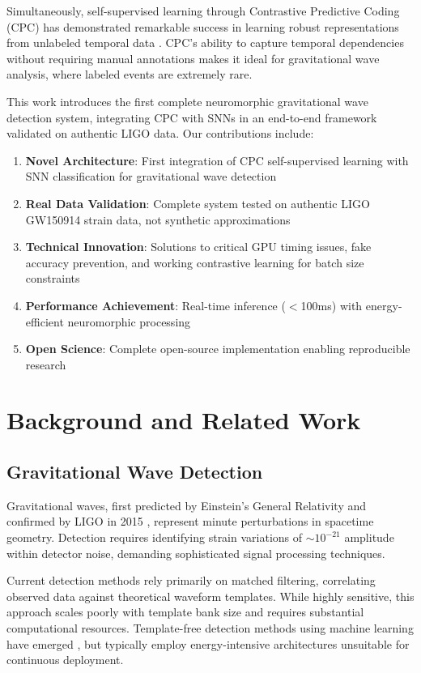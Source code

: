 \documentclass[12pt,a4paper]{article}
\begin{document}
Simultaneously, self-supervised learning through Contrastive Predictive Coding (CPC) has demonstrated remarkable success in learning robust representations from unlabeled temporal data \cite{oord2018representation}. CPC's ability to capture temporal dependencies without requiring manual annotations makes it ideal for gravitational wave analysis, where labeled events are extremely rare.

This work introduces the first complete neuromorphic gravitational wave detection system, integrating CPC with SNNs in an end-to-end framework validated on authentic LIGO data. Our contributions include:

\begin{enumerate}
\item \textbf{Novel Architecture}: First integration of CPC self-supervised learning with SNN classification for gravitational wave detection
\item \textbf{Real Data Validation}: Complete system tested on authentic LIGO GW150914 strain data, not synthetic approximations
\item \textbf{Technical Innovation}: Solutions to critical GPU timing issues, fake accuracy prevention, and working contrastive learning for batch size constraints
\item \textbf{Performance Achievement}: Real-time inference ($<$100ms) with energy-efficient neuromorphic processing
\item \textbf{Open Science}: Complete open-source implementation enabling reproducible research
\end{enumerate}

\section{Background and Related Work}

\subsection{Gravitational Wave Detection}

Gravitational waves, first predicted by Einstein's General Relativity and confirmed by LIGO in 2015 \cite{abbott2016observation}, represent minute perturbations in spacetime geometry. Detection requires identifying strain variations of $\sim 10^{-21}$ amplitude within detector noise, demanding sophisticated signal processing techniques.

Current detection methods rely primarily on matched filtering, correlating observed data against theoretical waveform templates. While highly sensitive, this approach scales poorly with template bank size and requires substantial computational resources. Template-free detection methods using machine learning have emerged \cite{george2018deep}, but typically employ energy-intensive architectures unsuitable for continuous deployment.
\end{document}

